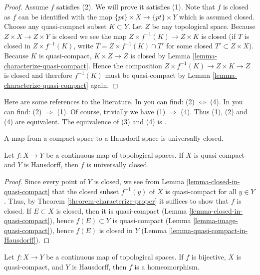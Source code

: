 \begin{proof}
\medskip\noindent
Assume $f$ satisfies (2). We will prove it satisfies (1).
Note that $f$ is closed as $f$ can be identified with the map
$\{pt\} \times X \to \{pt\} \times Y$ which is assumed closed.
Choose any quasi-compact subset $K \subset Y$.
Let $Z$ be any topological space.
Because $Z \times X \to Z \times Y$ is closed
we see the map $Z \times f^{-1}(K) \to Z \times K$
is closed (if $T$ is closed in $Z \times f^{-1}(K)$, write
$T = Z \times f^{-1}(K) \cap T'$ for some closed
$T' \subset Z \times X$). Because $K$ is quasi-compact,
$K \times Z\to Z$ is closed by Lemma \ref{lemma-characterize-quasi-compact}.
Hence the composition $Z \times f^{-1}(K)\to Z \times K \to Z$
is closed and therefore $f^{-1}(K)$ must be quasi-compact
by Lemma \ref{lemma-characterize-quasi-compact} again.
\end{proof}

\begin{remark}
\label{remark-proof-literature}
Here are some references to the literature.
In \cite[I, p. 75, Theorem 1]{Bourbaki} you can find:
(2) $\Leftrightarrow$ (4).
In \cite[I, p. 77, Proposition 6]{Bourbaki} you can find:
(2) $\Rightarrow$ (1).
Of course, trivially we have (1) $\Rightarrow$ (4).
Thus (1), (2) and (4) are equivalent.
The equivalence of (3) and (4) is \cite[Chapter II, Exercise 25]{LangReal}.
\end{remark}

\begin{lemma}
\label{lemma-closed-map}
\begin{slogan}
A map from a compact space to a Hausdorff space is universally closed.
\end{slogan}
Let $f : X \to Y$ be a continuous map of topological spaces.
If $X$ is quasi-compact and $Y$ is Hausdorff, then $f$ is
universally closed.
\end{lemma}

\begin{proof}
Since every point of $Y$ is closed, we see from
Lemma \ref{lemma-closed-in-quasi-compact}
that the closed subset $f^{-1}(y)$ of $X$ is quasi-compact for all $y \in Y$.
Thus, by Theorem \ref{theorem-characterize-proper}
it suffices to show that $f$ is closed.
If $E \subset X$ is closed, then it is quasi-compact
(Lemma \ref{lemma-closed-in-quasi-compact}),
hence $f(E) \subset Y$ is quasi-compact
(Lemma \ref{lemma-image-quasi-compact}),
hence $f(E)$ is closed in $Y$
(Lemma \ref{lemma-quasi-compact-in-Hausdorff}).
\end{proof}

\begin{lemma}
\label{lemma-bijective-map}
Let $f : X \to Y$ be a continuous map of topological spaces.
If $f$ is bijective, $X$ is quasi-compact, and $Y$ is Hausdorff,
then $f$ is a homeomorphism.
\end{lemma}

